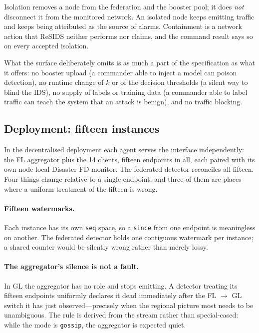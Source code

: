 Isolation removes a node from the federation and the booster pool; it does \emph{not}
disconnect it from the monitored network. An isolated node keeps emitting traffic and keeps
being attributed as the source of alarms. Containment is a network action that ReSIDS
neither performs nor claims, and the command result says so on every accepted isolation.

What the surface deliberately omits is as much a part of the specification as what it
offers: no booster upload (a commander able to inject a model can poison detection), no
runtime change of $k$ or of the decision thresholds (a silent way to blind the IDS), no
supply of labels or training data (a commander able to label traffic can teach the system
that an attack is benign), and no traffic blocking.

\subsection{Deployment: fifteen instances}
\label{sec:api-instances}

In the decentralised deployment each agent serves the interface independently: the FL
aggregator plus the 14 clients, fifteen endpoints in all, each paired with its own
node-local Disaster-FD monitor. The federated detector reconciles all fifteen. Four things
change relative to a single endpoint, and three of them are places where a uniform
treatment of the fifteen is wrong.

\paragraph{Fifteen watermarks.} Each instance has its own \texttt{seq} space, so a
\texttt{since} from one endpoint is meaningless on another. The federated detector holds one
contiguous watermark per instance; a shared counter would be silently wrong rather than
merely lossy.

\paragraph{The aggregator's silence is not a fault.} In GL the aggregator has no role and
stops emitting. A detector treating its fifteen endpoints uniformly declares it dead
immediately after the FL $\rightarrow$ GL switch it has just observed---precisely when the
regional picture most needs to be unambiguous. The rule is derived from the stream rather
than special-cased: while the mode is \texttt{gossip}, the aggregator is expected quiet.

